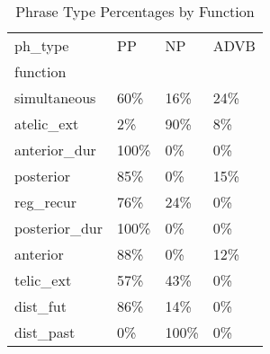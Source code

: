 \begin{table}[htbp!]
\centering
\caption{Phrase Type Percentages by Function}
\label{table:funcpt_pr}
\begin{tabular}{llll}
\toprule
ph\_type &    PP &    NP & ADVB \\
function      &       &       &      \\
\midrule
simultaneous  &   60\% &   16\% &  24\% \\
atelic\_ext    &    2\% &   90\% &   8\% \\
anterior\_dur  &  100\% &    0\% &   0\% \\
posterior     &   85\% &    0\% &  15\% \\
reg\_recur     &   76\% &   24\% &   0\% \\
posterior\_dur &  100\% &    0\% &   0\% \\
anterior      &   88\% &    0\% &  12\% \\
telic\_ext     &   57\% &   43\% &   0\% \\
dist\_fut      &   86\% &   14\% &   0\% \\
dist\_past     &    0\% &  100\% &   0\% \\
\bottomrule
\end{tabular}
\end{table}
